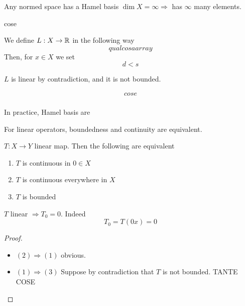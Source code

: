 Any normed space has a Hamel basis \(\dim X = \infty \Rightarrow \) has \(\infty\) many elements.

cose

We define \(L:X \to \mathbb{R}\) in the following way 
\[
    qualcosa array
\]
Then, for \(x \in X\) we set
\[
d<s    
\]
 
\(L\) is linear by contradiction, and it is not bounded.

\[
    \begin{array}{c}
        cose \\
    \end{array}
\]
\begin{remark}
    In practice, Hamel basis are 
\end{remark}
For linear operators, boundedness and continuity are equivalent.
\begin{theorem}
    \(T:X \to Y\) linear map. Then the following are equivalent
    \begin{enumerate}
        \item \(T\) is continuous in \(0 \in X\)
        \item \(T\) is continuous everywhere in \(X\)
        \item \(T\) is bounded
    \end{enumerate}
\end{theorem}
\begin{remark}
    \(T\) linear \(\Rightarrow T_0 = 0\). Indeed
    \[
        T_0 = T(0x) =  0
    \]
\end{remark}
\begin{proof}
    
    \begin{itemize}
        \item \((2) \Rightarrow (1)\) obvious.
        \item \((1) \Rightarrow (3)\) Suppose by contradiction that \(T\) is not bounded. TANTE COSE
    \end{itemize}
\end{proof}